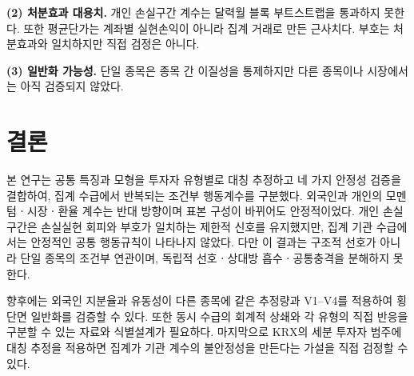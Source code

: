 \textbf{(2) 처분효과 대용치.} 개인 손실구간 계수는 달력월 블록 부트스트랩을 통과하지
못한다. 또한 평균단가는 계좌별 실현손익이 아니라 집계 거래로 만든 근사치다. 부호는
처분효과와 일치하지만 직접 검정은 아니다.

\textbf{(3) 일반화 가능성.} 단일 종목은 종목 간 이질성을 통제하지만 다른 종목이나
시장에서는 아직 검증되지 않았다.

\section{결론}
\label{sec:conclusion}

본 연구는 공통 특징과 모형을 투자자 유형별로 대칭 추정하고 네 가지 안정성 검증을
결합하여, 집계 수급에서 반복되는 조건부 행동계수를 구분했다. 외국인과 개인의
모멘텀ㆍ시장ㆍ환율 계수는 반대 방향이며 표본 구성이 바뀌어도 안정적이었다. 개인
손실구간은 손실실현 회피와 부호가 일치하는 제한적 신호를 유지했지만, 집계 기관
수급에서는 안정적인 공통 행동규칙이 나타나지 않았다. 다만 이 결과는 구조적 선호가
아니라 단일 종목의 조건부 연관이며, 독립적 선호ㆍ상대방 흡수ㆍ공통충격을 분해하지
못한다.

향후에는 외국인 지분율과 유동성이 다른 종목에 같은 추정량과 V1--V4를 적용하여
횡단면 일반화를 검증할 수 있다. 또한 동시 수급의 회계적 상쇄와 각 유형의 직접 반응을
구분할 수 있는 자료와 식별설계가 필요하다. 마지막으로 KRX의 세분 투자자 범주에 대칭
추정을 적용하면 집계가 기관 계수의 불안정성을 만든다는 가설을 직접 검정할 수 있다.
